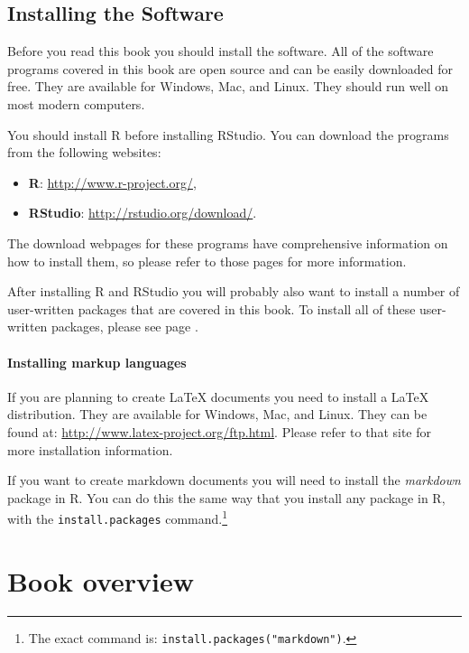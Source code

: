 \subsection{Installing the Software}\label{InstallR}

Before you read this book you should install the software. All of the software programs covered in this book are open source and can be easily downloaded for free. They are available for Windows, Mac, and Linux. They should run well on most modern computers. 

You should install R before installing RStudio. You can download the programs from the following websites:

\begin{itemize}
    \item {\bf{R}}: \url{http://www.r-project.org/},
    \item {\bf{RStudio}}: \url{http://rstudio.org/download/}.
\end{itemize}

\noindent The download webpages for these programs have comprehensive information on how to install them, so please refer to those pages for more information.

After installing R and RStudio you will probably also want to install a number of user-written packages that are covered in this book. To install all of these user-written packages, please see page \pageref{ReqPackages}.

\paragraph{Installing markup languages}

If you are planning to create LaTeX documents you need to install a LaTeX distribution. They are available for Windows, Mac, and Linux. They can be found at: \url{http://www.latex-project.org/ftp.html}. Please refer to that site for more installation information.

If you want to create markdown documents you will need to install the {\emph{markdown}} package in R. You can do this the same way that you install any package in R, with the {\tt{install.packages}} command.\footnote{The exact command is: {\tt{install.packages("markdown")}}.} 


\section{Book overview}

